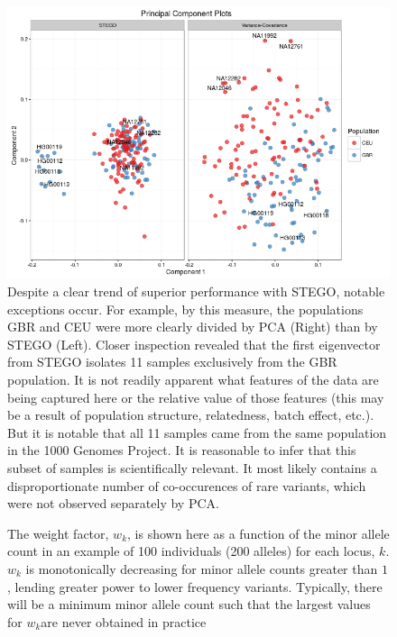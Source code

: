 \begin{figure}
\includegraphics[width=1\columnwidth]{./figures/PCA_CEU_GBR}\caption{Despite a clear trend of superior performance with STEGO, notable
exceptions occur. For example, by this measure, the populations GBR
and CEU were more clearly divided by PCA (Right) than by STEGO (Left).
Closer inspection revealed that the first eigenvector from STEGO isolates
11 samples exclusively from the GBR population. It is not readily
apparent what features of the data are being captured here or the
relative value of those features (this may be a result of population
structure, relatedness, batch effect, etc.). But it is notable that
all 11 samples came from the same population in the 1000 Genomes Project.
It is reasonable to infer that this subset of samples is scientifically
relevant. It most likely contains a disproportionate number of co-occurences
of rare variants, which were not observed separately by PCA.}
\end{figure}

\begin{figure}
 \caption{The weight factor, $w_{k}$, is shown here as a function of the minor
allele count in an example of 100 individuals (200 alleles) for each
locus, $k$. $w_{k}$ is monotonically decreasing for minor allele
counts greater than $1$, lending greater power to lower frequency
variants.  Typically, there will be a minimum minor allele count such
that the largest values for $w_{k}$are never obtained in practice}
\end{figure}

